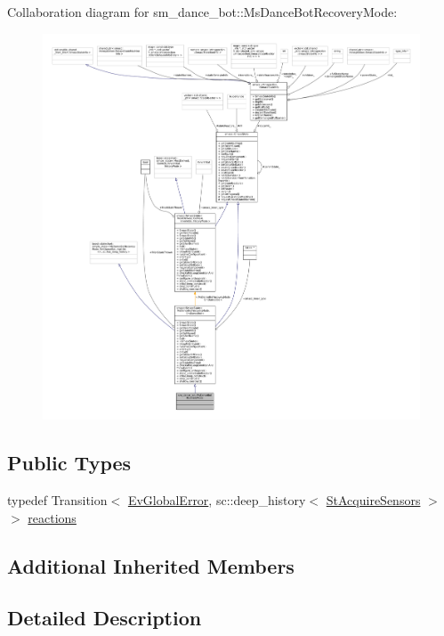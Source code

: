 Collaboration diagram for sm\+\_\+dance\+\_\+bot\+:\+:Ms\+Dance\+Bot\+Recovery\+Mode\+:
\nopagebreak
\begin{figure}[H]
\begin{center}
\leavevmode
\includegraphics[width=350pt]{classsm__dance__bot_1_1MsDanceBotRecoveryMode__coll__graph}
\end{center}
\end{figure}
\subsection*{Public Types}
\begin{DoxyCompactItemize}
\item 
typedef Transition$<$ \hyperlink{structsm__dance__bot_1_1EvGlobalError}{Ev\+Global\+Error}, sc\+::deep\+\_\+history$<$ \hyperlink{structsm__dance__bot_1_1StAcquireSensors}{St\+Acquire\+Sensors} $>$ $>$ \hyperlink{classsm__dance__bot_1_1MsDanceBotRecoveryMode_a6e60e1284c7fa82c286c0a3388029e87}{reactions}
\end{DoxyCompactItemize}
\subsection*{Additional Inherited Members}


\subsection{Detailed Description}


